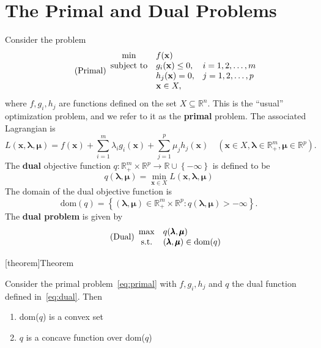 \documentclass[12pt]{report}
\theoremstyle{definition}
\begin{document}
\section{The Primal and Dual Problems}

Consider the problem
\begin{equation}\label{eq:primal}
    \tag{Primal}
    \begin{array}{c @{\quad} l @{\quad} l}
        \min & f(\mathbf{x}) & \\
        \text{subject to} & g_i(\mathbf{x})\le 0, & i=1,2,\ldots,m \\
                          & h_j(\mathbf{x})=0, & j=1,2,\ldots,p \\
        & \mathbf{x}\in X,
    \end{array} 
\end{equation} 
where $f,g_i,h_j$ are functions defined on the set $X\subseteq\mathbb{R}^{n}$.
This is the ``usual'' optimization problem, and we refer to it as the
\textbf{primal} problem. The associated Lagrangian is
\[
        L(\mathbf{x},\pmb{\lambda},\pmb{\mu})=
        f(\mathbf{x})+\sum_{i=1}^{m} \lambda_ig_i(\mathbf{x})
        +\sum_{j=1}^{p} \mu_jh_j(\mathbf{x})
        \quad
        (\mathbf{x}\in
        X,\pmb{\lambda}\in\mathbb{R}^m_+,\pmb{\mu}\in\mathbb{R}^{p}).
\]
The \textbf{dual} objective function
$q:\mathbb{R}^m_+\times\mathbb{R}^{p}\rightarrow\mathbb{R}\cup\left\{-\infty\right\}$
is defined to be
\[
    q(\pmb{\lambda},\pmb{\mu})=\underset{\mathbf{x}\in
    X}{\min}L(\mathbf{x},\pmb{\lambda},\pmb{\mu})
\]
The domain of the dual objective function is
\[
    \text{dom}(q)=\left\{(\pmb{\lambda},\pmb{\mu})\in\mathbb{R}^{m}_+\times\mathbb{R}^{p}:q(\pmb{\lambda},\pmb{\mu})>-\infty\right\}.
\]
The \textbf{dual problem} is given by
\begin{equation*}\label{eq:dual}
    \tag{Dual}
    \begin{array}{c @{\quad} l}
        \max & q(\pmb{\lambda},\pmb{\mu}) \\
        \text{s.t.} & (\pmb{\lambda},\pmb{\mu})\in\text{dom}(q)
    \end{array} 
\end{equation*}

[theorem]{Theorem}
\begin{concavity of q}
    Consider the primal problem~\eqref{eq:primal} with $f,g_i,h_j$ and $q$ the
    dual function defined in~\eqref{eq:dual}. Then
    \begin{enumerate}[label = (\alph*)]
        \item dom($q$) is a convex set
        \item $q$ is a concave function over dom($q$)
    \end{enumerate}
\end{concavity of q}
\end{document}
